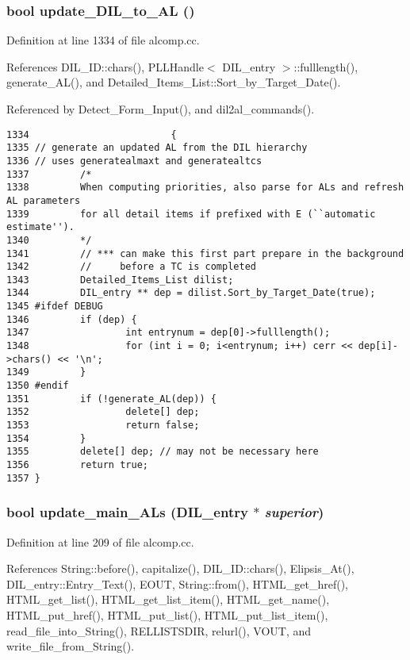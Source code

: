 \subsubsection{\setlength{\rightskip}{0pt plus 5cm}bool update\_\-DIL\_\-to\_\-AL ()}\label{dil2al_8hh_a295}




Definition at line 1334 of file alcomp.cc.

References DIL\_\-ID::chars(), PLLHandle$<$ DIL\_\-entry $>$::fulllength(), generate\_\-AL(), and Detailed\_\-Items\_\-List::Sort\_\-by\_\-Target\_\-Date().

Referenced by Detect\_\-Form\_\-Input(), and dil2al\_\-commands().



\footnotesize\begin{verbatim}1334                         {
1335 // generate an updated AL from the DIL hierarchy
1336 // uses generatealmaxt and generatealtcs
1337         /*
1338         When computing priorities, also parse for ALs and refresh AL parameters
1339         for all detail items if prefixed with E (``automatic estimate'').
1340         */
1341         // *** can make this first part prepare in the background
1342         //     before a TC is completed
1343         Detailed_Items_List dilist;
1344         DIL_entry ** dep = dilist.Sort_by_Target_Date(true);
1345 #ifdef DEBUG
1346         if (dep) {
1347                 int entrynum = dep[0]->fulllength();
1348                 for (int i = 0; i<entrynum; i++) cerr << dep[i]->chars() << '\n';
1349         }
1350 #endif
1351         if (!generate_AL(dep)) {
1352                 delete[] dep;
1353                 return false;
1354         }
1355         delete[] dep; // may not be necessary here
1356         return true;
1357 }
\end{verbatim}\normalsize 
{}
\subsubsection{\setlength{\rightskip}{0pt plus 5cm}bool update\_\-main\_\-ALs ({\bf DIL\_\-entry} $\ast$ {\em superior})}\label{dil2al_8hh_a287}




Definition at line 209 of file alcomp.cc.

References String::before(), capitalize(), DIL\_\-ID::chars(), Elipsis\_\-At(), DIL\_\-entry::Entry\_\-Text(), EOUT, String::from(), HTML\_\-get\_\-href(), HTML\_\-get\_\-list(), HTML\_\-get\_\-list\_\-item(), HTML\_\-get\_\-name(), HTML\_\-put\_\-href(), HTML\_\-put\_\-list(), HTML\_\-put\_\-list\_\-item(), read\_\-file\_\-into\_\-String(), RELLISTSDIR, relurl(), VOUT, and write\_\-file\_\-from\_\-String().

